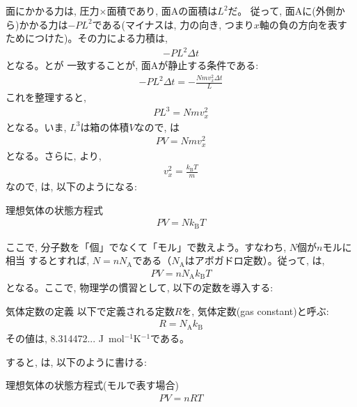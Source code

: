 面にかかる力は, 圧力×面積であり, 面Aの面積は$L^2$だ。
従って, 面Aに(外側から)かかる力は$-PL^2$である(マイナスは, 力の向き, 
つまり$x$軸の負の方向を表すためにつけた)。その力による力積は, 
\begin{eqnarray}-PL^2\Delta t\label{eq:gas_motion_collide2}\end{eqnarray}
となる。とが
一致することが, 面Aが静止する条件である:
\begin{eqnarray}-PL^2\Delta t=-\frac{Nmv_x^2\Delta t}{L}\end{eqnarray}
これを整理すると, 
\begin{eqnarray}PL^3=Nmv_x^2\label{eq:gas_stat_eq_5}\end{eqnarray}
となる。いま, $L^3$は箱の体積$V$なので, は
\begin{eqnarray}PV=Nmv_x^2\label{eq:gas_stat_eq_6}\end{eqnarray}
となる。さらに, より, 
\begin{eqnarray}v_x^2=\frac{k_{\text{B}}T}{m}\end{eqnarray}
なので, は, 以下のようになる:
\begin{itembox}{理想気体の状態方程式}
\begin{eqnarray}PV=Nk_{\text{B}}T\label{eq:gas_stat_eq_7}\end{eqnarray}
\end{itembox}

ここで, 分子数を「個」でなくて「モル」で数えよう。すなわち, $N$個が$n$モルに相当
するとすれば, $N=nN_\text{A}$である（$N_\text{A}$はアボガドロ定数）。従って, は, 
\begin{eqnarray}PV=nN_\text{A}k_{\text{B}}T\label{eq:gas_stat_eq_72}\end{eqnarray}
となる。ここで, 物理学の慣習として, 以下の定数を導入する:
\begin{itembox}{気体定数の定義}
以下で定義される定数$R$を, 気体定数(gas constant)と呼ぶ:
\begin{eqnarray}R=N_\text{A}k_{\text{B}}\label{eq:def_gas_const}\end{eqnarray}
その値は, 8.314472... J~mol$^{-1}$K$^{-1}$である。
\end{itembox}
すると, は, 以下のように書ける:
\begin{itembox}{理想気体の状態方程式(モルで表す場合)}
\begin{eqnarray}PV=nRT\label{eq:gas_stat_eq_74}\end{eqnarray}
\end{itembox}

